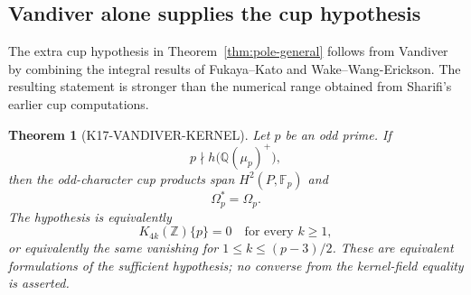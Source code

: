 \documentclass[11pt,a4paper]{article}
\newtheorem{theorem}{Theorem}[section]
\theoremstyle{definition}
\begin{document}
\subsection{Vandiver alone supplies the cup hypothesis}
\label{sec:vandiver-kernel}

The extra cup hypothesis in Theorem~\ref{thm:pole-general} follows from
Vandiver by combining the integral results of Fukaya--Kato and
Wake--Wang-Erickson. The resulting statement is stronger than the numerical
range obtained from Sharifi's earlier cup computations.

\begin{theorem}[K17-VANDIVER-KERNEL]\label{thm:vandiver-kernel}
Let $p$ be an odd prime. If
\[
 p\nmid h\bigl(\mathbb Q(\mu_p)^+\bigr),
\]
then the odd-character cup products span $H^2(P,\mathbb F_p)$ and
\[
 \Omega_p^*=\Omega_p.
\]
The hypothesis is equivalently
\[
 K_{4k}(\mathbb Z)\{p\}=0
 \quad\text{for every }k\ge1,
\]
or equivalently the same vanishing for $1\le k\le(p-3)/2$.
These are equivalent formulations of the sufficient hypothesis;
no converse from the kernel-field equality is asserted.
\end{theorem}
\end{document}
